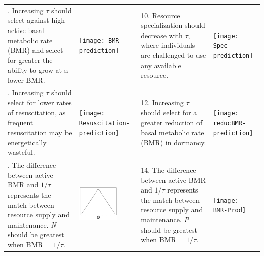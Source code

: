 \documentclass{article}
\begin{document}
\begin{table}
\begin{tabularx}{\textwidth}{m{6cm} m{3cm} m{6cm} m{3cm}}
 \addlinespace
 9. Increasing $\tau$ should select against high active basal metabolic rate (BMR) and select for greater the ability to grow  at a lower BMR.
 &
 \begin{minipage}{.3\textwidth}
 \texttt{[image: BMR-prediction]}
 \end{minipage}
 &
 10. Resource specialization should decrease with $\tau$, where individuals are challenged to use any available resource.
 &
 \begin{minipage}{.3\textwidth}
 \texttt{[image: Spec-prediction]}
 \end{minipage} \\
 
 \addlinespace
 11. Increasing $\tau$ should select for lower rates of resuscitation, as frequent resuscitation may be energetically wasteful.
 &
 \begin{minipage}{.3\textwidth}
 \texttt{[image: Resuscitation-prediction]}
 \end{minipage}
 &
 12. Increasing $\tau$ should select for a greater reduction of basal metabolic rate (BMR) in dormancy.
 &
 \begin{minipage}{.3\textwidth}
 \texttt{[image: reducBMR-prediction]}
 \end{minipage} \\
 
 \addlinespace
 13. The difference between active BMR and $1/\tau$ represents the match between resource supply and maintenance. \textit{N} should be greatest when BMR = $1/\tau$.
 &
 \begin{minipage}{.3\textwidth}
 \includegraphics[width=20mm, height=20mm]{BMR-N}
 \end{minipage}
 &
 14. The difference between active BMR and $1/\tau$ represents the match between resource supply and maintenance. \textit{P} should be greatest when BMR = $1/\tau$.
 &
 \begin{minipage}{.3\textwidth}
 \texttt{[image: BMR-Prod]}
 \end{minipage} \\
 
 \bottomrule
\end{tabularx}
\end{table}
\end{document}
